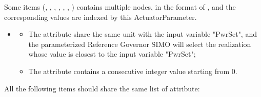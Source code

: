 Some items (, , , , , , 
) contains multiple  nodes, in the format of 
, and the corresponding 
values are indexed by this ActuatorParameter. 
\begin{itemize}
  \item 
  \begin{itemize}
    \item The  attribute share the same unit with the input variable "PwrSet", and the 
    parameterized Reference Governor SIMO will select the realization whose  value is 
    closest to the input variable "PwrSet";
    \item The  attribute contains a consecutive integer value starting from 0.
  \end{itemize}
\end{itemize}
All the following items should share the same list of  attribute:
